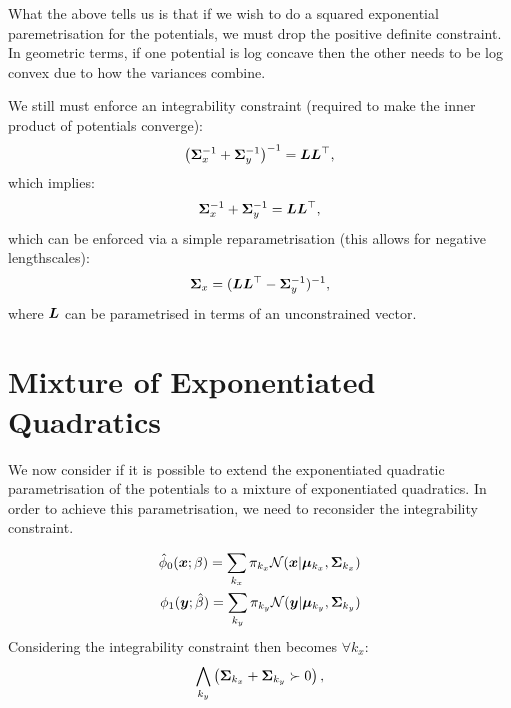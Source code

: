 \documentclass[a4paper,12pt,twoside,openright]{report}
\theoremstyle{definition}
\begin{document}
What the above tells us is that if we wish to do a squared exponential paremetrisation for the potentials, we must drop the positive definite constraint. In geometric terms, if one potential is log concave then the other needs to be log convex due to how the variances combine.

We still must enforce an integrability constraint (required to make the inner product of potentials converge):
\begin{align*}
\left({\bm{\Sigma}}_x^{-1} +{\bm{\Sigma}}_y^{-1}\right)^{-1} = {\bm{L}}{\bm{L}}^{\top},
\end{align*}
which implies:
\begin{align*}
{\bm{\Sigma}}_x^{-1} +{\bm{\Sigma}}_y^{-1} = {\bm{L}}{\bm{L}}^{\top},
\end{align*}
which can be enforced via a simple reparametrisation (this allows for negative lengthscales):
\begin{align*}
{\bm{\Sigma}}_x = ({\bm{L}}{\bm{L}}^{\top} -{\bm{\Sigma}}_y^{-1})^{-1},
\end{align*}
where ${\bm{L}}$ can be parametrised in terms of an unconstrained vector.
\section{Mixture of Exponentiated Quadratics}


We now consider if it is possible to extend the exponentiated quadratic  parametrisation of the potentials to a mixture of exponentiated quadratics. In order to achieve this parametrisation, we need to reconsider the integrability constraint.

\begin{align}
{\hat{\phi}}_0( {\bm{x}} ; \beta) =  \sum_{k_x} \pi_{k_x} {\mathcal{N}}({\bm{x}} | {\bm{\mu}}_{k_x}, {\bm{\Sigma}}_{k_x}) \\
\phi_1( {\bm{y}} ; \hat{\beta}) = \sum_{k_y} \pi_{k_y}  {\mathcal{N}}({\bm{y}} | {\bm{\mu}}_{k_y}, {\bm{\Sigma}}_{k_y}) 
\end{align}
Considering  the integrability constraint then becomes $\forall k_x$:
\begin{align*}
   \bigwedge_{k_y} \left({\bm{\Sigma}}_{k_x} +{\bm{\Sigma}}_{k_y} \succ 0\right), 
\end{align*}
\end{document}
